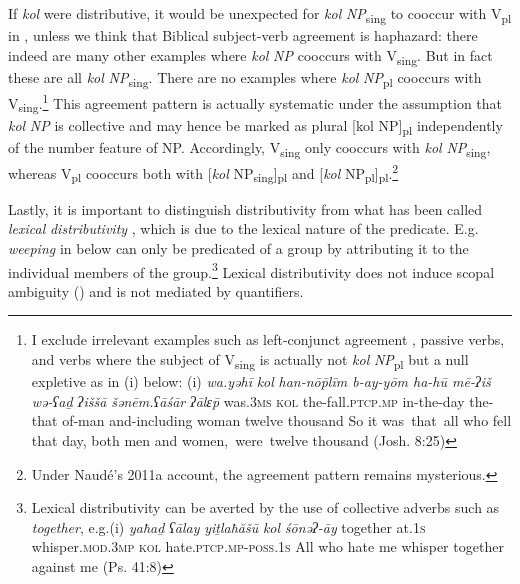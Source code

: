 \documentclass[output=paper]{langsci/langscibook}
\begin{document}
If \textit{kol} were distributive, it would be unexpected for \textit{kol} \textit{NP}\textsubscript{sing} to cooccur with V\textsubscript{pl} in , unless we think that Biblical subject-verb agreement is haphazard: there indeed are many  other examples where \textit{kol} \textit{NP} cooccurs with V\textsubscript{sing}. But in fact these are all \textit{kol} \textit{NP}\textsubscript{sing}. There are no examples where \textit{kol} \textit{NP}\textsubscript{pl} cooccurs with V\textsubscript{sing}.\footnote{I exclude irrelevant examples such as left-conjunct agreement \citep{Doron2005}, passive verbs, and verbs where the subject of \textrm{V}\textrm{\textsubscript{sing}} is actually not \textit{kol} \textit{NP}\textsubscript{pl} but a null expletive as in (i) below: \textrm{(i)}\textrm{  \textit{wa.yəhī}   \textit{kol}   \textit{han-nō}}\textit{\={p}līm         b-ay-yōm  ha-hū    mē-ʔiš  wə-ʕaḏ            ʔiššā     šənēm.ʕā}\textrm{\textit{śār} \textit{ʔālɛ}}\textit{\={p}}  was.\textsc{3ms} \textsc{kol} the-fall.\textsc{ptcp.mp} in-the-day the-that of-man and-including woman twelve         thousand  \textrm{So it was~that~all who fell that day, both men and women,~were~twelve thousand} (Josh. 8:25)} This agreement pattern is actually systematic under the assumption that \textit{kol} \textit{NP} is collective and may hence be marked as plural [kol NP]\textsubscript{pl} independently of the number feature of NP. Accordingly, V\textsubscript{sing} only cooccurs with \textit{kol} \textit{NP}\textsubscript{sing}, whereas V\textsubscript{pl} cooccurs both with [\textit{kol} NP\textsubscript{sing}]\textsubscript{pl} and [\textit{kol} NP\textsubscript{pl}]\textsubscript{pl}.\footnote{Under Naudé’s 2011a account, the agreement pattern remains mysterious.} 

Lastly, it is important to distinguish distributivity from what has been called \textit{lexical} \textit{distributivity} \citep{Winter2000}, which is due to the lexical nature of the predicate. E.g. \textit{weeping} in  below can only be predicated of a group by attributing it to the individual members of the group.\footnote{Lexical distributivity can be averted by the use of collective adverbs such as \textit{together}, e.g.\textrm{(i)}\textrm{  \textit{yaħaḏ}     \textit{ʕālay} \textit{yiṯlaħă}}\textit{š}\textrm{\textit{ū}                 \textit{kol}   \textit{ś}}\textit{ōnəʔ-āy}  together at.\textsc{1s}  whisper.\textsc{mod.3mp}  \textsc{kol}  hate.\textsc{ptcp.mp}{}-\textsc{poss.1s}  \textrm{All who hate me whisper together against me} (Ps. 41:8)} Lexical distributivity does not induce scopal ambiguity (\citealt{Vries2017}) and is not mediated by quantifiers. 
\end{document}
